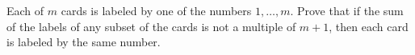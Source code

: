 Each of $m$ cards is labeled by one of the numbers $1, \ldots, m$. Prove that if the sum of the labels of any subset of the cards is not a multiple of $m + 1$, then each card is labeled by the same number.
